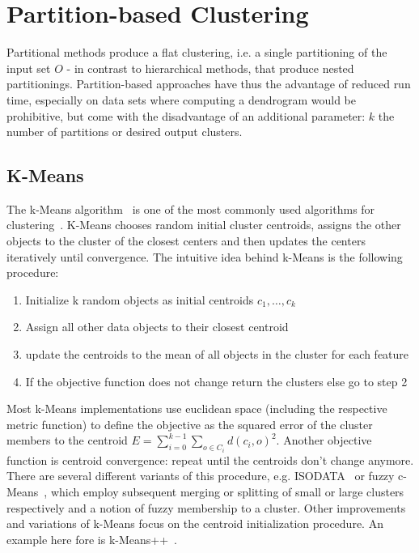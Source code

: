 \section{Partition-based Clustering}\label{\positionnumber}
Partitional methods produce a flat clustering, i.e. a single partitioning of the input set $O$ - in contrast to hierarchical methods, that produce nested partitionings. Partition-based approaches have thus the advantage of reduced run time, especially on data sets where computing a dendrogram would be prohibitive, but come with the disadvantage of an additional parameter: $k$ the number of partitions or desired output clusters. 
\subsection{K-Means}\label{\positionnumber}
The k-Means algorithm~\cite{lloyd1982least, macqueen1967some} is one of the most commonly used algorithms for clustering~\cite{Jin2010}. K-Means chooses random initial cluster centroids, assigns the other objects to the cluster of the closest centers and then updates the centers iteratively until convergence. The intuitive idea behind k-Means is the following procedure: 
\begin{enumerate}
    \item Initialize k random objects as initial centroids $c_1, \dots, c_k$
    \item Assign all other data objects to their closest centroid
    \item update the centroids to the mean of all objects in the cluster for each feature
    \item If the objective function does not change return the clusters else go to step 2
\end{enumerate}

Most k-Means implementations use euclidean space (including the respective metric function) to define the objective as the squared error of the cluster members to the centroid $E = \sum_{i=0}^{k-1}\sum_{o \in C_i} d(c_i,o)^2$. Another objective function is centroid convergence: repeat until the centroids don't change anymore. There are several different variants of this procedure, e.g. ISODATA~\cite{ball1967clustering} or fuzzy c-Means~\cite{fuzzy-c-means}, which employ subsequent merging or splitting of small or large clusters respectively and a notion of fuzzy membership to a cluster. Other improvements and variations of k-Means focus on the centroid initialization procedure. An example here fore is k-Means++~\cite{arthur2007k}. \\


